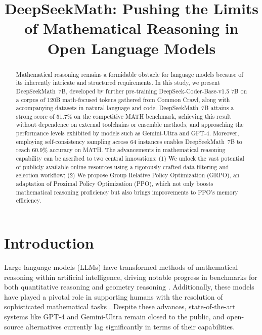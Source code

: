 \title{DeepSeekMath: Pushing the Limits of Mathematical Reasoning in Open Language Models}

\begin{abstract}
Mathematical reasoning remains a formidable obstacle for language models because of its inherently intricate and structured requirements. In this study, we present DeepSeekMath~7B, developed by further pre-training DeepSeek-Coder-Base-v1.5 7B on a corpus of 120B math-focused tokens gathered from Common Crawl, along with accompanying datasets in natural language and code. DeepSeekMath~7B attains a strong score of 51.7\% on the competitive MATH benchmark, achieving this result without dependence on external toolchains or ensemble methods, and approaching the performance levels exhibited by models such as Gemini-Ultra and GPT-4. Moreover, employing self-consistency sampling across 64 instances enables DeepSeekMath~7B to reach 60.9\% accuracy on MATH. The advancements in mathematical reasoning capability can be ascribed to two central innovations: (1) We unlock the vast potential of publicly available online resources using a rigorously crafted data filtering and selection workflow; (2) We propose Group Relative Policy Optimization (GRPO), an adaptation of Proximal Policy Optimization (PPO), which not only boosts mathematical reasoning proficiency but also brings improvements to PPO’s memory efficiency.
\end{abstract}

\section{Introduction}

Large language models (LLMs) have transformed methods of mathematical reasoning within artificial intelligence, driving notable progress in benchmarks for both quantitative reasoning \citep{MATH} and geometry reasoning \citep{trinh2024solving}. Additionally, these models have played a pivotal role in supporting humans with the resolution of sophisticated mathematical tasks \citep{tao}. Despite these advances, state-of-the-art systems like GPT-4 \citep{gpt4} and Gemini-Ultra \citep{gemini} remain closed to the public, and open-source alternatives currently lag significantly in terms of their capabilities.

